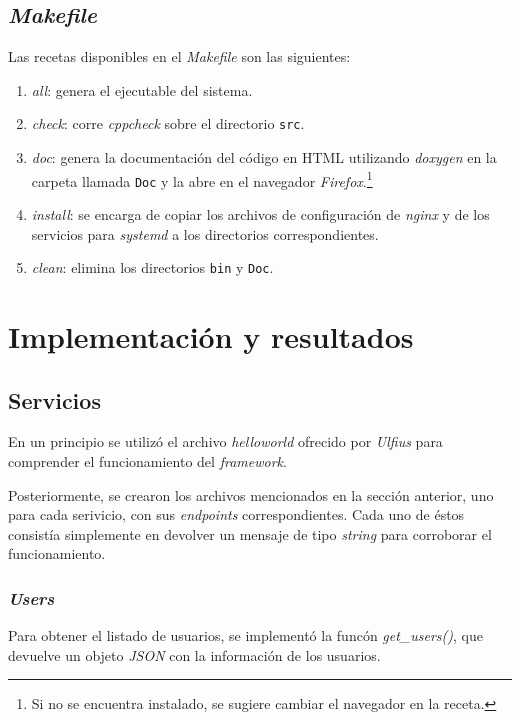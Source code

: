\documentclass[12pt,a4paper]{article}
\begin{document}
\subsection{\emph{Makefile}}
\label{make}
Las recetas disponibles en el \emph{Makefile} son las siguientes:

\begin{enumerate}[leftmargin=1.5cm]
  \item \emph{all}: genera el ejecutable del sistema.
  \item \emph{check}: corre \emph{cppcheck} sobre el directorio
  \verb|src|.
  \item \emph{doc}: genera la documentación del código en HTML
  utilizando \emph{doxygen} en la carpeta llamada \verb|Doc| y la
  abre en el navegador \emph{Firefox}.\footnote{Si no se encuentra
  instalado, se sugiere cambiar el navegador en la receta.}
  \item \emph{install}: se encarga de copiar los archivos de configuración de
  \emph{nginx} y de los servicios para \emph{systemd} a los directorios
  correspondientes.
  \item \emph{clean}: elimina los directorios \verb|bin| y
  \verb|Doc|.
\end{enumerate}


\section{Implementación y resultados}
\label{impres}

\subsection{Servicios}
\label{servicios}
En un principio se utilizó el archivo \emph{helloworld} ofrecido por \emph{Ulfius}
para comprender el funcionamiento del \emph{framework}.

Posteriormente, se crearon los archivos mencionados en la sección anterior, uno
para cada serivicio, con sus \emph{endpoints} correspondientes. Cada uno de
éstos consistía simplemente en devolver un mensaje de tipo \emph{string} para
corroborar el funcionamiento.

\subsubsection{\emph{Users}}
\label{users}
Para obtener el listado de usuarios, se implementó la funcón \emph{get\_users()},
que devuelve un objeto \emph{JSON} con la información de los usuarios.
\end{document}
